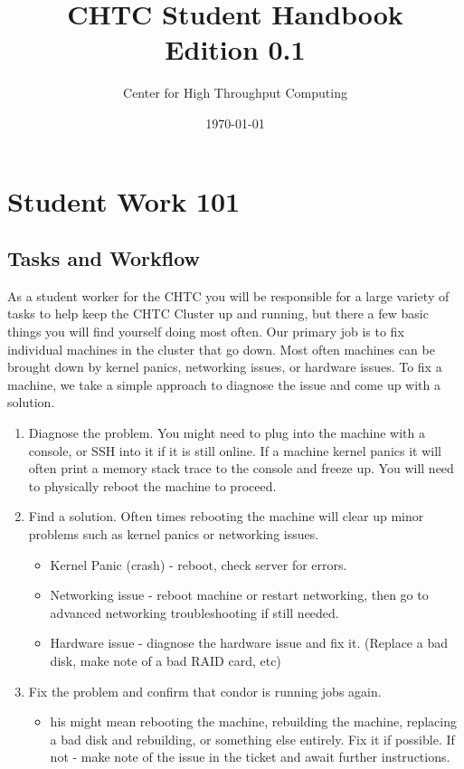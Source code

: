 \documentclass[10pt,letterpaper]{article}
\begin{document}
\title{CHTC Student Handbook \\
    \large Edition 0.1}
\author{Center for High Throughput Computing}
\date{\today}
\maketitle

\tableofcontents
\clearpage

\section{Student Work 101}
    \subsection{Tasks and Workflow}
        As a student worker for the CHTC you will be responsible for a large variety
        of tasks to help keep the CHTC Cluster up and running, but there a few basic
        things you will find yourself doing most often. Our primary job is to fix
        individual machines in the cluster that go down. Most often machines can
        be brought down by kernel panics, networking issues, or hardware issues.
        To fix a machine, we take a simple approach to diagnose the issue and come
        up with a solution.

        \begin{enumerate}
            \item Diagnose the problem. You might need to plug into the machine
            with a console, or SSH into it if it is still online. If a machine
            kernel panics it will often print a memory stack trace to the console
            and freeze up. You will need to physically reboot the machine to proceed.
            \item Find a solution. Often times rebooting the machine will clear up
            minor problems such as kernel panics or networking issues.
            \begin{itemize}
                \item Kernel Panic (crash) - reboot, check server for errors.
                \item Networking issue - reboot machine or restart networking, then
                go to advanced networking troubleshooting if still needed.
                \item Hardware issue - diagnose the hardware issue and fix it.
                (Replace a bad disk, make note of a bad RAID card, etc)
            \end{itemize}
            \item Fix the problem and confirm that condor is running jobs again.
            \begin{itemize}
                \item his might mean rebooting the machine, rebuilding the machine,
                replacing a bad disk and rebuilding, or something else entirely.
                Fix it if possible. If not - make note of the issue in the ticket
                and await further instructions.
            \end{itemize}
        \end{enumerate}
\end{document}
